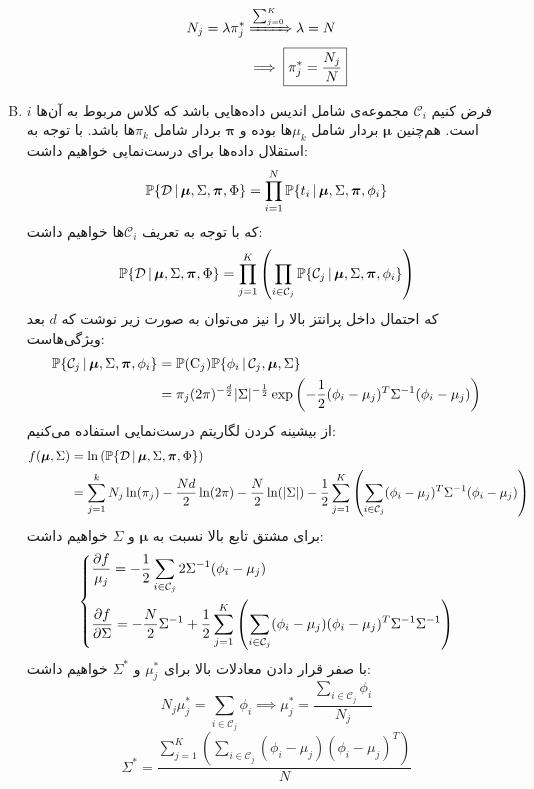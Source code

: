 \documentclass[a4paper, 12pt]{article}
\begin{document}
\begin{enumerate}[A)]
\[\begin{aligned}
		N_j = \lambda\pi^\ast_j &\xRightarrow{\sum_{j=0}^K} \lambda = N \\
		&\implies \boxed{\pi^\ast_j = \frac{N_j}{N}}
	\end{aligned}
	\]
	\item
	فرض کنیم $\mathcal{C}_i$ مجموعه‌ی شامل اندیس داده‌هایی باشد که کلاس مربوط به آن‌ها $i$ است. هم‌چنین $\bm{\mu}$ بردار شامل $\mu_k$ها بوده و $\bm{\pi}$ بردار شامل $\pi_k$ها باشد. با توجه به استقلال داده‌ها برای درست‌نمایی خواهیم داشت:
	\[
	{\mathbb P}\{\mathcal{D}\,|\,\bm{\mu}, \Sigma, \bm{\pi}, \Phi\} = \prod_{i=1}^N{\mathbb P}\{t_i \,|\, \bm{\mu}, \Sigma, \bm{\pi}, \phi_i\}
	\]
	که با توجه به تعریف $\mathcal{C}_i$ها خواهیم داشت:
	\[
	{\mathbb P}\{\mathcal{D}\,|\,\bm{\mu}, \Sigma, \bm{\pi}, \Phi\} = \prod_{j=1}^K\left(\prod_{i\in \mathcal{C}_j} {\mathbb P}\{\mathcal{C}_j \,|\, \bm{\mu}, \Sigma, \bm{\pi}, \phi_i\}\right)
	\]
	که احتمال داخل پرانتز بالا را نیز می‌توان به صورت زیر نوشت که $d$ بعد ویژگی‌هاست:
	\[
	\begin{aligned}
		{\mathbb P}\{\mathcal{C}_j \,|\, \bm{\mu}, \Sigma, \bm{\pi}, \phi_i\} &= {\mathbb P}(\mathrm{C}_j){\mathbb P}\{\phi_i\,|\, \mathcal{C}_j, \bm{\mu}, \Sigma\} \\
		&= \pi_j (2\pi)^{-\frac{d}{2}}|\Sigma|^{-\frac{1}{2}} \exp\left(-\frac{1}{2}(\phi_i-\mu_j)^T\Sigma^{-1}(\phi_i-\mu_j)\right)
	\end{aligned}
	\]
	از بیشینه کردن لگاریتم درست‌نمایی استفاده می‌کنیم:
	\[
	\begin{aligned}
	f(\bm{\mu}, \Sigma) &= \ln\left({\mathbb P}\{\mathcal{D}\,|\,\bm{\mu}, \Sigma, \bm{\pi}, \Phi\}\right) \\
	&= \sum_{j=1}^k N_j\ln(\pi_j) - \frac{Nd}{2}\ln(2\pi) - \frac{N}{2}\ln(|\Sigma|) - \frac{1}{2} \sum_{j=1}^K \left(\sum_{i\in \mathcal{C}_j}(\phi_i-\mu_j)^T\Sigma^{-1}(\phi_i-\mu_j)\right)
	\end{aligned}
	\]
	برای مشتق تابع بالا نسبت به $\bm{\mu}$ و $\Sigma$ خواهیم داشت:
	\[
	\begin{dcases}
		\frac{\partial f}{\mu_j} = -\frac{1}{2}\sum_{i\in \mathcal{C}_j} 2\Sigma^{-1}(\phi_i-\mu_j) \\
		\frac{\partial f}{\partial \Sigma} = -\frac{N}{2}\Sigma^{-1} + \frac{1}{2} \sum_{j=1}^K \left(\sum_{i\in \mathcal{C}_j}(\phi_i-\mu_j)(\phi_i-\mu_j)^T\Sigma^{-1}\Sigma^{-1}\right)
	\end{dcases}
	\]
	با صفر قرار دادن معادلات بالا برای $\mu^\ast_j$ و $\Sigma^\ast$ خواهیم داشت:
	\[
	N_j\mu_j^\ast = \sum_{i\in \mathcal{C}_j}\phi_i \implies \boxed{\mu^\ast_j = \frac{\sum_{i\in \mathcal{C}_j}\phi_i}{N_j}}
	\]
	\[
	\boxed{\Sigma^\ast = \dfrac{\sum_{j=1}^K\left(\sum_{i\in \mathcal{C}_j}(\phi_i-\mu_j)(\phi_i-\mu_j)^T\right)}{N}}
	\]
\end{enumerate}
\end{document}
